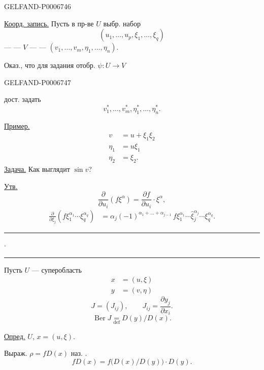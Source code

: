 \begin{GelfandAdjacentEvidence}{GELFAND-P000674}{6}


\underline{Коорд. запись.} Пусть в пр-ве \(U\) выбр. набор
\[
(u_1,\ldots,u_p,\xi_1,\ldots,\xi_q)
\]
\hspace*{2em}--- \textquotedbl{} --- \(V\) --- \textquotedbl{} ---
\((v_1,\ldots,v_m,\eta_1,\ldots,\eta_n)\).

Оказ., что для задания отобр. \(\psi:U\to V\)
\end{GelfandAdjacentEvidence}
\begin{GelfandAdjacentEvidence}{GELFAND-P000674}{7}

дост. задать
\[
v_1^*,\ldots,v_m^*,\eta_1^*,\ldots,\eta_n^*.
\]

\underline{Пример.}
\[
\begin{aligned}
v&=u+\xi_1\xi_2\\
\eta_1&=u\xi_1\\
\eta_2&=\xi_2.
\end{aligned}
\]
\underline{Задача.} Как выглядит \(\sin v\)?

\underline{Утв.}
\[
\frac{\partial}{\partial u_i}(f\xi^\alpha)
=\frac{\partial f}{\partial u_i}\cdot\xi^\alpha,
\]
\[
\begin{aligned}
\frac{\partial}{\partial\xi_j}
  (f\xi_1^{\alpha_1}\cdots\xi_q^{\alpha_q})
&=\alpha_j(-1)^{\alpha_1+\ldots+\alpha_{j-1}}\,
  f\xi_1^{\alpha_1}\cdots\widehat{\xi}_j^{\alpha_j}\cdots\xi_q^{\alpha_q}.
\end{aligned}
\]
\end{GelfandAdjacentEvidence}


\noindent\rule{23mm}{.45pt}\enspace\(\cdot\)\enspace\rule{17mm}{.45pt}

Пусть \(U\) --- суперобласть
\[
\begin{aligned}
x&=(u,\xi)\\
y&=(v,\eta)
\end{aligned}
\]
\[
J=(J_{ij}),\qquad J_{ij}=\frac{\partial y_j}{\partial x_i}.
\]
\[
\operatorname{Ber}J\underset{\mathrm{def}}{=}D(y)/D(x).
\]

\underline{Опред.} \(U\), \(x=(u,\xi)\).

Выраж. \(\rho=fD(x)\) наз. .
\[
fD(x)=f\bigl(D(x)/D(y)\bigr)\cdot D(y).
\]

